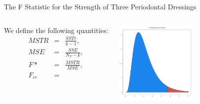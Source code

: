 \begin{frame}{The F Statistic for the Strength of Three Periodontal Dressings }

  \begin{columns}

    We define the following quantities:
    \begin{eqnarray*}
      MSTR & = & \frac{SSTr}{k-1}, \\
      MSE  & = & \frac{SSE}{N_T - k}, \\
      F*   & = & \frac{MSTR}{MSE}, \\
      F_{cr} & = &
    \end{eqnarray*}

    \vfill


    \vfill

    \centerline{\includegraphics[width=4cm]{img/FDistribution}}

    \vfill

    \end{columns}

  
\end{frame}



